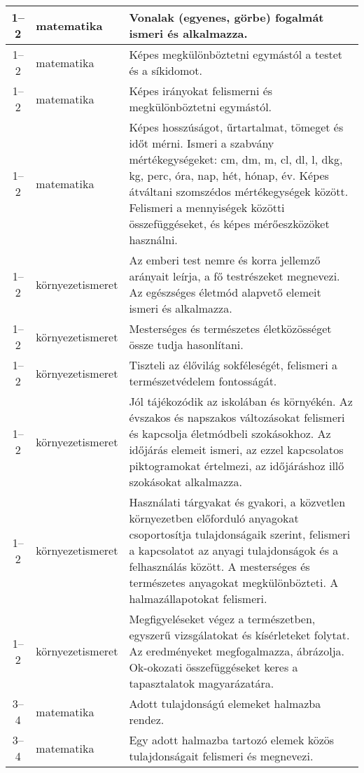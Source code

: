 \begin{small}
\begin{longtable}{c | p{2cm} |  p{11cm} }
              1--2 & matematika & Vonalak (egyenes, görbe) fogalmát ismeri és alkalmazza. \\ \hline
              1--2 & matematika & Képes megkülönböztetni egymástól a testet és a síkidomot. \\ \hline
              1--2 & matematika & Képes irányokat felismerni és megkülönböztetni egymástól. \\ \hline
              1--2 & matematika & Képes hosszúságot, űrtartalmat, tömeget és időt mérni. Ismeri a szabvány mértékegységeket: cm, dm, m, cl, dl, l, dkg, kg, perc, óra, nap, hét, hónap, év. Képes átváltani szomszédos mértékegységek között. Felismeri a mennyiségek közötti összefüggéseket, és képes mérőeszközöket használni. \\ \hline
              1--2 & környezet\-ismeret & Az emberi test nemre és korra jellemző arányait leírja, a fő testrészeket megnevezi. Az egészséges életmód alapvető elemeit ismeri és alkalmazza. \\ \hline
              1--2 & környezet\-ismeret & Mesterséges és természetes életközösséget össze tudja hasonlítani. \\ \hline
              1--2 & környezet\-ismeret & Tiszteli az élővilág sokféleségét, felismeri a természetvédelem fontosságát. \\ \hline
              1--2 & környezet\-ismeret & Jól tájékozódik az iskolában és környékén. Az évszakos és napszakos változásokat felismeri és kapcsolja életmódbeli szokásokhoz. Az időjárás elemeit ismeri, az ezzel kapcsolatos piktogramokat értelmezi, az időjáráshoz illő szokásokat alkalmazza. \\ \hline
              1--2 & környezet\-ismeret & Használati tárgyakat és gyakori, a közvetlen környezetben előforduló anyagokat csoportosítja tulajdonságaik szerint, felismeri a kapcsolatot az anyagi tulajdonságok és a felhasználás között. A mesterséges és természetes anyagokat megkülönbözteti. A halmazállapotokat felismeri. \\ \hline
              1--2 & környezet\-ismeret & Megfigyeléseket végez a természetben, egyszerű vizsgálatokat és kísérleteket  folytat. Az eredményeket megfogalmazza, ábrázolja. Ok-okozati összefüggéseket keres a tapasztalatok magyarázatára. \\ \hline
              3--4 & matematika & Adott tulajdonságú elemeket halmazba rendez. \\ \hline
              3--4 & matematika & Egy adott halmazba tartozó elemek közös tulajdonságait felismeri és megnevezi. \\ \hline

\end{longtable}
\end{small}
